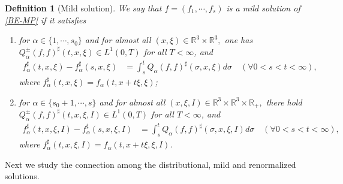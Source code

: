 \documentclass[reqno,11pt]{amsart}
\newtheorem{definition}{Definition}[section]
\numberwithin{equation}{section}
\def\R{\mathbb{R}}
\begin{document}
\begin{definition}[Mild solution]\label{def-mild}
	We say that $f=(f_1,\cdots,f_s)$ is a mild solution of \eqref{BE-MP} if it satisfies 
\begin{enumerate}
	\item {for $\alpha \in \{1,\cdots,s_0\}$ and for almost all $(x,\xi)\in \R^3 \times \R^3,$ one has $Q^\pm_\alpha (f,f)^\sharp (t,x,\xi ) \in L^1 (0,T)$ for all $T<\infty$, and
		\begin{equation*}
			\begin{aligned}
					f^\sharp_\alpha (t,x,\xi )-f^\sharp_\alpha(s,x,\xi ) &=\int_{s}^{t} Q_\alpha(f,f)^\sharp (\sigma ,x,\xi )d\sigma \quad (\forall 0<s<t<\infty),
			\end{aligned}
		\end{equation*}	
	where $f^\sharp_\alpha (t,x,\xi )= f_\alpha(t,x+t\xi ,\xi )$;}
	\item {for $\alpha \in \{s_0+1,\cdots ,s\}$ and for almost all $(x,\xi,I) \in \R^3 \times \R^3\times \R_+,$ there hold $Q^\pm_\alpha (f,f)^\sharp (t,x,\xi ,I) \in L^1(0,T)$ for all $T<\infty$, and
			\begin{equation}\label{mild}
			\begin{aligned}
				f^\sharp_\alpha (t,x,\xi ,I)-f^\sharp_\alpha(s,x,\xi ,I) &=\int_{s}^{t} Q_\alpha(f,f)^\sharp (\sigma ,x,\xi ,I)d\sigma \quad (\forall 0<s<t<\infty),
			\end{aligned}
		\end{equation}	
		where $f^\sharp_\alpha(t,x,\xi ,I)= f_\alpha(t,x+t\xi ,\xi ,I)$.}
\end{enumerate}
\end{definition}

Next we study the connection among the distributional, mild and renormalized solutions. 
\end{document}

